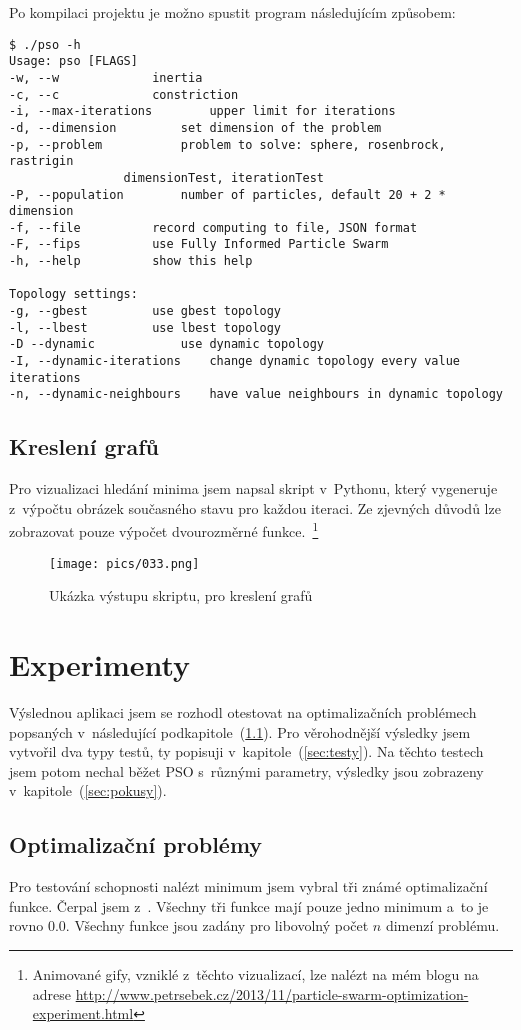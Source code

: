\documentclass[12pt,a4paper,fleqn]{article}
\begin{document}
Po kompilaci projektu je možno spustit program následujícím způsobem:
\begin{verbatim}
$ ./pso -h
Usage: pso [FLAGS]
-w, --w				inertia
-c, --c				constriction
-i, --max-iterations		upper limit for iterations
-d, --dimension			set dimension of the problem
-p, --problem			problem to solve: sphere, rosenbrock, rastrigin
				dimensionTest, iterationTest
-P, --population		number of particles, default 20 + 2 * dimension
-f, --file			record computing to file, JSON format
-F, --fips			use Fully Informed Particle Swarm
-h, --help			show this help

Topology settings:
-g, --gbest			use gbest topology
-l, --lbest			use lbest topology
-D --dynamic			use dynamic topology
-I, --dynamic-iterations	change dynamic topology every value iterations
-n, --dynamic-neighbours	have value neighbours in dynamic topology

\end{verbatim}

\subsection{Kreslení grafů}
Pro vizualizaci hledání minima jsem napsal skript v~Pythonu, který vygeneruje z~výpočtu obrázek současného stavu pro každou iteraci. Ze zjevných důvodů lze zobrazovat pouze výpočet dvourozměrné funkce.~\footnote{Animované gify, vzniklé z~těchto vizualizací, lze nalézt na mém blogu na adrese \url{http://www.petrsebek.cz/2013/11/particle-swarm-optimization-experiment.html}}
\begin{figure*}[h]
\label{pic:plot-example}
\centering
\texttt{[image: pics/033.png]}
\caption{Ukázka výstupu skriptu, pro kreslení grafů}
\end{figure*}

\newpage
\section{Experimenty} \label{experimenty}
Výslednou aplikaci jsem se rozhodl otestovat na optimalizačních problémech popsaných v~následující podkapitole~(\ref{sec:optimalizacni-problemy}). Pro věrohodnější výsledky jsem vytvořil dva typy testů, ty popisuji v~kapitole~(\ref{sec:testy}). Na těchto testech jsem potom nechal běžet PSO s~různými parametry, výsledky jsou zobrazeny v~kapitole~(\ref{sec:pokusy}).

\subsection{Optimalizační problémy} \label{sec:optimalizacni-problemy}
Pro testování schopnosti nalézt minimum jsem vybral tři známé optimalizační funkce. Čerpal jsem z~\cite{molga2005test}. Všechny tři funkce mají pouze jedno minimum a~to je rovno 0.0. Všechny funkce jsou zadány pro libovolný počet $n$ dimenzí problému.
\end{document}
